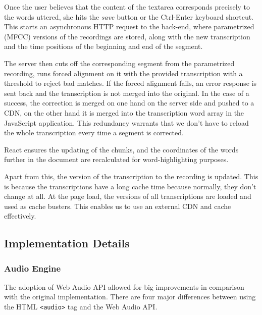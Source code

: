 \documentclass{svproc}
\begin{document}
Once the user believes that the content of the textarea corresponds precisely
to the words uttered, she hits the {\em save} button or the Ctrl-Enter keyboard
shortcut. This starts an asynchronous HTTP request to the back-end, where
parametrized (MFCC) versions of the recordings are stored, along with the new
transcription and the time positions of the beginning and end of the segment.

The server then cuts off the corresponding segment from the parametrized
recording, runs forced alignment on it with the provided transcription with a
threshold to reject bad matches. If the forced alignment fails, an error
response is sent back and the transcription is not merged into the original. In
the case of a success, the correction is merged on one hand on the server side
and pushed to a CDN, on the other hand it is merged into the transcription word
array in the JavaScript application. This redundancy warrants that we don't have
to reload the whole transcription every time a segment is corrected.

React ensures the updating of the chunks, and the coordinates of the words
further in the document are recalculated for word-highlighting purposes.

Apart from this, the version of the transcription to the recording is updated.
This is because the transcriptions have a long cache time because normally, they
don't change at all. At the page load, the versions of all transcriptions are
loaded and used as cache busters. This enables us to use an external CDN and
cache effectively.

\subsection{Implementation Details}

\subsubsection{Audio Engine}

The adoption of Web Audio API\cite{adenot2013web} allowed for big improvements
in comparison with the original implementation. There are four major differences
between using the HTML \texttt{<audio>} tag and the Web Audio API.
\end{document}
